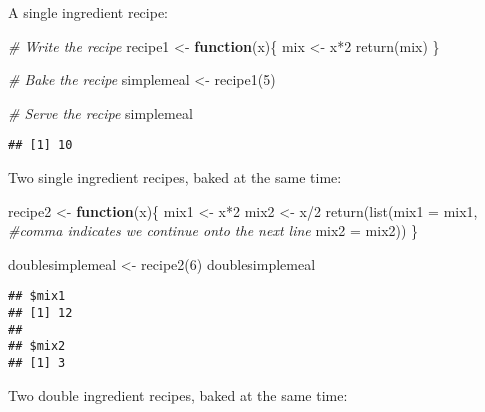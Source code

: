 \documentclass[
]{article}
\newenvironment{Shaded}{\begin{snugshade}}{\end{snugshade}}
\newcommand{\AttributeTok}[1]{\textcolor[rgb]{0.77,0.63,0.00}{#1}}
\newcommand{\CommentTok}[1]{\textcolor[rgb]{0.56,0.35,0.01}{\textit{#1}}}
\newcommand{\ControlFlowTok}[1]{\textcolor[rgb]{0.13,0.29,0.53}{\textbf{#1}}}
\newcommand{\DecValTok}[1]{\textcolor[rgb]{0.00,0.00,0.81}{#1}}
\newcommand{\FunctionTok}[1]{\textcolor[rgb]{0.00,0.00,0.00}{#1}}
\newcommand{\NormalTok}[1]{#1}
\newcommand{\OtherTok}[1]{\textcolor[rgb]{0.56,0.35,0.01}{#1}}
\newcommand{\SpecialCharTok}[1]{\textcolor[rgb]{0.00,0.00,0.00}{#1}}
\begin{document}
A single ingredient recipe:

\begin{Shaded}
\begin{Highlighting}[]
\CommentTok{\# Write the recipe}
\NormalTok{recipe1 }\OtherTok{\textless{}{-}} \ControlFlowTok{function}\NormalTok{(x)\{}
\NormalTok{  mix }\OtherTok{\textless{}{-}}\NormalTok{ x}\SpecialCharTok{*}\DecValTok{2}
  \FunctionTok{return}\NormalTok{(mix)}
\NormalTok{\}}

\CommentTok{\# Bake the recipe}
\NormalTok{simplemeal }\OtherTok{\textless{}{-}} \FunctionTok{recipe1}\NormalTok{(}\DecValTok{5}\NormalTok{)}

\CommentTok{\# Serve the recipe}
\NormalTok{simplemeal}
\end{Highlighting}
\end{Shaded}

\begin{verbatim}
## [1] 10
\end{verbatim}

Two single ingredient recipes, baked at the same time:

\begin{Shaded}
\begin{Highlighting}[]
\NormalTok{recipe2 }\OtherTok{\textless{}{-}} \ControlFlowTok{function}\NormalTok{(x)\{}
\NormalTok{  mix1 }\OtherTok{\textless{}{-}}\NormalTok{ x}\SpecialCharTok{*}\DecValTok{2}
\NormalTok{  mix2 }\OtherTok{\textless{}{-}}\NormalTok{ x}\SpecialCharTok{/}\DecValTok{2}
  \FunctionTok{return}\NormalTok{(}\FunctionTok{list}\NormalTok{(}\AttributeTok{mix1 =}\NormalTok{ mix1, }\CommentTok{\#comma indicates we continue onto the next line}
              \AttributeTok{mix2 =}\NormalTok{ mix2))}
\NormalTok{\}}

\NormalTok{doublesimplemeal }\OtherTok{\textless{}{-}} \FunctionTok{recipe2}\NormalTok{(}\DecValTok{6}\NormalTok{)}
\NormalTok{doublesimplemeal}
\end{Highlighting}
\end{Shaded}

\begin{verbatim}
## $mix1
## [1] 12
## 
## $mix2
## [1] 3
\end{verbatim}

Two double ingredient recipes, baked at the same time:
\end{document}
